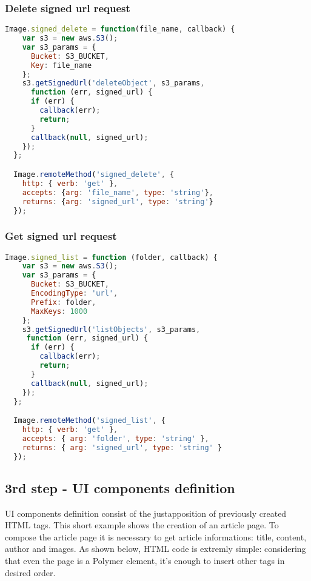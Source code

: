 \subsubsection{Delete signed url request}

\begin{lstlisting}[language=javascript]
Image.signed_delete = function(file_name, callback) {
    var s3 = new aws.S3();
    var s3_params = {
      Bucket: S3_BUCKET,
      Key: file_name
    };
    s3.getSignedUrl('deleteObject', s3_params,
      function (err, signed_url) {
      if (err) {
        callback(err);
        return;
      }
      callback(null, signed_url);
    });
  };

  Image.remoteMethod('signed_delete', {
    http: { verb: 'get' },
    accepts: {arg: 'file_name', type: 'string'},
    returns: {arg: 'signed_url', type: 'string'}
  });

\end{lstlisting}

\subsubsection{Get signed url request}

\begin{lstlisting}[language=javascript]
Image.signed_list = function (folder, callback) {
    var s3 = new aws.S3();
    var s3_params = {
      Bucket: S3_BUCKET,
      EncodingType: 'url',
      Prefix: folder,
      MaxKeys: 1000
    };
    s3.getSignedUrl('listObjects', s3_params,
     function (err, signed_url) {
      if (err) {
        callback(err);
        return;
      }
      callback(null, signed_url);
    });
  };

  Image.remoteMethod('signed_list', {
    http: { verb: 'get' },
    accepts: { arg: 'folder', type: 'string' },
    returns: { arg: 'signed_url', type: 'string' }
  });
\end{lstlisting}


\subsection{3rd step - UI components definition}


UI components definition consist of the justapposition of previously created HTML tags. This short example shows the creation of an article page.
To compose the article page it is necessary to get article informations: title, content, author and images.
As shown below, HTML code is extremly simple: considering that even the page is a Polymer element, it's enough to insert other tags in desired order. 


